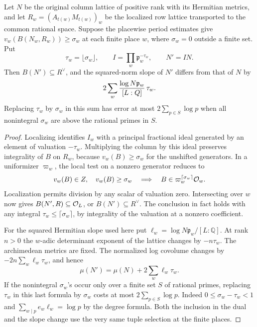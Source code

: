 \begin{proposition}\label{prop:finite-period-shift}
Let \(N\) be the original column lattice of positive rank
with its Hermitian metrics, and let \(R_w=(A_{t(w)}M_{t(w)})_w\)
be the localized row lattice transported to the common rational space. Suppose the placewise period estimates give
\(v_w(B(N_w,R_w))\ge\sigma_w\) at each finite place \(w\), where
\(\sigma_w=0\) outside a finite set. Put
\[
 \tau_w=\lfloor\sigma_w\rfloor,\qquad
 I=\prod_w\mathfrak p_w^{-\tau_w},\qquad N'=IN .
\]
Then \(B(N')\subseteq R^\vee\), and the squared-norm slope of
\(N'\) differs from that of \(N\) by
\[
 2\sum_w \frac{\log N\mathfrak p_w}{[L:\Q]}\,\tau_w.
\]
Replacing \(\tau_w\) by \(\sigma_w\) in this sum has error at most
\(2\sum_{p\in S}\log p\) when all nonintegral \(\sigma_w\) are
above the rational primes in \(S\).
\end{proposition}

\begin{proof}
Localizing identifies \(I_w\) with a principal fractional ideal
generated by an element of valuation \(-\tau_w\). Multiplying the
column by this ideal preserves integrality of \(B\) on \(R_w\),
because \(v_w(B)\ge\sigma_w\) for the unshifted generators.
In a uniformizer \(\varpi_w\), the local test on a nonzero generator reduces to
\[
  v_w(B)\in\mathbb Z,\quad v_w(B)\ge\sigma_w\quad\Longrightarrow\quad B\in\varpi_w^{\lceil\sigma_w\rceil}{\cal O}_w .
\]
Localization permits division by any scalar of valuation zero.
Intersecting over \(w\) now gives \(B(N',R)\subseteq{\cal O}_L\),
or \(B(N')\subseteq R^\vee\). The conclusion in fact holds with
any integral \(\tau_w\le\lceil\sigma_w\rceil\), by integrality
of the valuation at a nonzero coefficient.

For the squared Hermitian slope used here put
\(\ell_w=\log N\mathfrak p_w/[L:\mathbb Q]\).
At rank \(n>0\) the \(w\)-adic determinant exponent of the
lattice changes by \(-n\tau_w\). The archimedean metrics are
fixed. The normalized log covolume changes by
\(-2n\sum_w\ell_w\tau_w\), and hence
\[
           \mu(N')=\mu(N)+2\sum_w\ell_w\tau_w .
\]
If the nonintegral \(\sigma_w\)'s occur only over a finite set
\(S\) of rational primes, replacing \(\tau_w\) in this last
formula by \(\sigma_w\) costs at most \(2\sum_{p\in S}\log p\).
Indeed \(0\le\sigma_w-\tau_w<1\) and
\(\sum_{w\mid p}e_w\ell_w=\log p\) by the degree formula. Both
the inclusion in the dual and the slope change use the very
same tuple selection at the finite places.
\end{proof}

